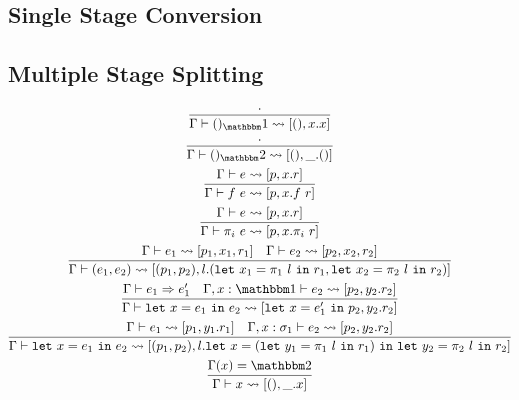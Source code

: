 \documentclass{article}
\newcommand {\bbone} {\mathbbm 1}
\newcommand {\bbtwo} {\mathbbm 2}
\newcommand {\letin} [3] {{\tt let}~{#1} = {#2}~{\tt in}~{#3}}
\newcommand {\splits} {\rightsquigarrow}
\begin{document}
\subsection {Single Stage Conversion}
\subsection {Multiple Stage Splitting}
\begin{gather}
\infer {\Gamma \vdash ()_\bbone \splits [(),x.x]}{\cdot} \\
\infer {\Gamma \vdash ()_\bbtwo \splits [(),\_.()]}{\cdot} \\
\infer {\Gamma \vdash f~e \splits [p,x.f~r]}{\Gamma \vdash e \splits [p,x.r]} \\
\infer {\Gamma \vdash \pi_i~e \splits [p,x.\pi_i~r]}{\Gamma \vdash e \splits [p,x.r]} \\
\infer {\Gamma \vdash (e_1,e_2) \splits [(p_1,p_2), l.(\letin{x_1}{\pi_1~l}{r_1},\letin{x_2}{\pi_2~l}{r_2})]}{\Gamma \vdash e_1 \splits [p_1,x_1,r_1] & \Gamma \vdash e_2 \splits [p_2,x_2,r_2]} \\
\infer {\Gamma\vdash \letin {x}{e_1}{e_2} \splits [\letin {x}{e'_1}{p_2}, y_2.r_2] }{\Gamma\vdash e_1 \Rightarrow e_1' & \Gamma, x:\bbone \vdash e_2 \splits [p_2,y_2.r_2]} \\
\infer {\Gamma\vdash \letin {x}{e_1}{e_2} \splits [(p_1,p_2), l.\letin {x}{(\letin {y_1}{\pi_1~l}{r_1})}{\letin {y_2}{\pi_2~l}{r_2}}] }{\Gamma\vdash e_1 \splits [p_1,y_1.r_1] & \Gamma, x:\sigma_1 \vdash e_2 \splits [p_2,y_2.r_2]} \\
\infer {\Gamma\vdash x \splits [(),\_.x]}{\Gamma(x) = \bbtwo}
\end{gather}
\end{document}
